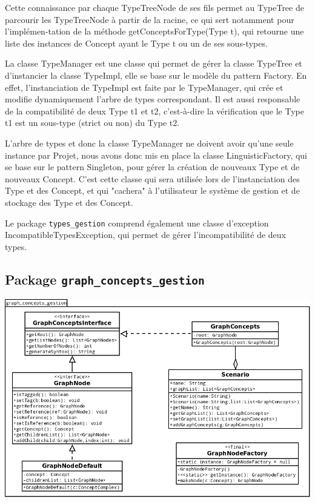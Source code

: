 \documentclass[12pt]{report}
\begin{document}
Cette connaissance par chaque TypeTreeNode de ses fils permet au TypeTree de parcourir les TypeTreeNode à partir de la racine, ce qui sert notamment pour l'implémen-tation de la méthode getConceptsForType(Type t), qui retourne une liste des instances de Concept ayant le Type t ou un de ses sous-types.

\bigskip

La classe TypeManager est une classe qui permet de gérer la classe TypeTree et d'instancier la classe TypeImpl, elle se base sur le modèle du pattern Factory. En effet, l'instanciation de TypeImpl est faite par le TypeManager, qui crée et modifie dynamiquement l'arbre de types correspondant. Il est aussi responsable de la compatibilité de deux Type t1 et t2, c'est-à-dire la vérification que le Type t1 est un sous-type (strict ou non) du Type t2.

\bigskip

L'arbre de types et donc la classe TypeManager ne doivent avoir qu'une seule instance par Projet, nous avons donc mis en place la classe LinguisticFactory, qui se base sur le pattern Singleton, pour gérer la création de nouveaux Type et de nouveaux Concept. C'est cette classe qui sera utilisée lors de l'instanciation des Type et des Concept, et qui "cachera" à l'utilisateur le système de gestion et de stockage des Type et des Concept.

\bigskip

Le package \texttt{types\_gestion} comprend également une classe d'exception IncompatibleTypesException, qui permet de gérer l'incompatibilité de deux types.

\subsection{Package \texttt{graph\_concepts\_gestion}}

\begin{center}
\includegraphics[scale=0.5]{DiagLinguistic_graph_concepts_gestion.png}
\end{center}
\end{document}
